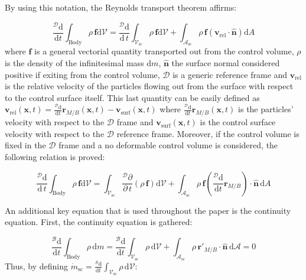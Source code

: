 By using this notation, the Reynolds transport theorem affirms:

\begin{equation}
	\frac{^\mathcal{D}\text{d}}{\text{d}t}\int_{\text{Body}} \rho\,\bm{f}\text{d}\mathcal{V} = \frac{^\mathcal{D} \text{d}}{\text{d}\,t}\int_{\mathcal{V}_\text{sc}} \rho\,\bm{f}\text{d}\mathcal{V}  + \int_{\mathcal{A}_\text{sc}} \rho\,\bm{f} \left(\bm{v}_{\text{rel}}\cdot \hat{\bm{n}}\right)\text{d}A
\end{equation}
\noindent
where $\bm{f}$ is a general vectorial quantity transported out from the control volume, $\rho$ is the density of the infinitesimal mass $\text{d}m$, $\hat{\bm{n}}$ the surface normal considered positive if exiting from the control volume, $\mathcal{D}$ is a generic reference frame and $\bm{v}_{\text{rel}}$ is the relative velocity of the particles flowing out from the surface with respect to the control surface itself. This last quantity can be easily defined as $\bm{v}_{\text{rel}}(\bm{x},t) =\displaystyle\frac{^\mathcal{D}\text{d}}{\text{d}t}\bm{r}_{M/B}(\bm{x},t) - \bm{v}_{\text{surf}}(\bm{x},t)$ where $\displaystyle\frac{^\mathcal{D}\text{d}}{\text{d}t}\bm{r}_{M/B}(\bm{x},t)$ is the particles' velocity with respect to the $\mathcal{D}$ frame and $\bm{v}_{\text{surf}}(\bm{x},t)$ is the control surface velocity with respect to the $\mathcal{D}$ reference frame.\newline
Moreover, if the control volume is fixed in the $\mathcal{D}$ frame and a no deformable control volume is considered, the following relation is proved:

\begin{equation}
	\frac{^\mathcal{D}\text{d}}{\text{d}\,t}\int_{\text{Body}} \rho\,\bm{f}\text{d}\mathcal{V} = \int_{\mathcal{V}_\text{sc}} \frac{ ^\mathcal{D}\partial}{\partial\,t}\left(\rho\,\bm{f}\right)\text{d}\mathcal{V}+ \int_{\mathcal{A}_\text{sc}} \rho\,\bm{f} \left(\frac{^\mathcal{D}\text{d}}{\text{d}t}\bm{r}_{M/B}\right)\cdot \hat{\bm{n}}\,\text{d}A
\end{equation}

An additional key equation that is used throughout the paper is the continuity equation. First, the continuity equation is gathered:

\begin{equation}
	\frac{^\mathcal{B}\text{d}}{\text{d}t}\int_{\text{Body}} \rho\, \text{d}m = \frac{^\mathcal{B}\text{d}}{\text{d}t}\int_{\mathcal{V}_\text{sc}} \rho\, \text{d}\mathcal{V} + \int_{\mathcal{A}_\text{sc}} \rho\,\bm{r}'_{M/B} \cdot \hat{\bm{n}}\,\text{d}\mathcal{A}=0
\end{equation}
\noindent
Thus, by defining $\dot{m}_\text{sc} = \frac{^\mathcal{B}\text{d}}{\text{d}t}\int_{\mathcal{V}_\text{sc}} \rho\, \text{d}\mathcal{V}$:

